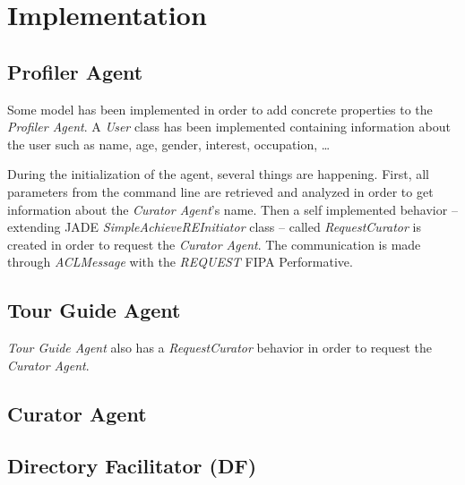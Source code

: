 \documentclass[a4paper,11pt]{article}
\begin{document}
  \newcommand{\pa}{\textit{Profiler Agent}}
  \newcommand{\cu}{\textit{Curator Agent}}
  \renewcommand{\to}{\textit{Tour Guide Agent}}
  
  \section{Implementation}
  
  
  \subsection{Profiler Agent}
  
  Some model has been implemented in order to add concrete properties to the \pa{}. A \textit{User} class has been implemented containing information 
  about the user such as name, age, gender, interest, occupation, \dots{}
  
  During the initialization of the agent, several things are happening. First, all parameters from the command line are retrieved and analyzed in order 
  to get information about the \cu{}'s name. Then a self implemented behavior -- extending JADE \textit{SimpleAchieveREInitiator} class -- called 
  \textit{RequestCurator} is created in order to request the \cu{}. The communication is made through \textit{ACLMessage} with the \textit{REQUEST} FIPA 
  Performative.
  
  
  \subsection{Tour Guide Agent}
  
  
  \to{} also has a \textit{RequestCurator} behavior in order to request the \cu{}.
  
  \subsection{Curator Agent}
  
  
  \subsection{Directory Facilitator (DF)}
\end{document}
